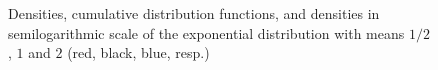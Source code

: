 \documentclass{beamer}
\begin{document}
\begin{frame}[allowframebreaks]
\begin{figure}[hbt]
\centering
{}
\caption{Densities, cumulative distribution functions, and densities in semilogarithmic scale of the exponential distribution with means $1/2$, $1$ and $2$ (red, black, blue, resp.)}\label{Fig:ExponentialDistribution}
\end{figure}
\end{frame}
\end{document}
